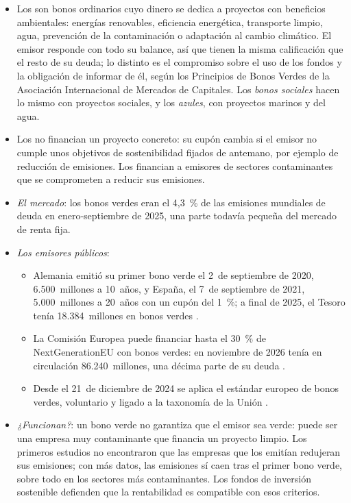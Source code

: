\documentclass[11pt]{article}
\begin{document}
\begin{itemize}
\item Los  son bonos ordinarios cuyo dinero se dedica a proyectos con beneficios ambientales: energías renovables, eficiencia energética, transporte limpio, agua, prevención de la contaminación o adaptación al cambio climático. El emisor responde con todo su balance, así que tienen la misma calificación que el resto de su deuda; lo distinto es el compromiso sobre el uso de los fondos y la obligación de informar de él, según los Principios de Bonos Verdes de la Asociación Internacional de Mercados de Capitales\nocite{ICMA2021GBP,Investopedia2026GreenBond}. Los \emph{bonos sociales} hacen lo mismo con proyectos sociales, y los \emph{azules}, con proyectos marinos y del agua.
\item Los  no financian un proyecto concreto: su cupón cambia si el emisor no cumple unos objetivos de sostenibilidad fijados de antemano, por ejemplo de reducción de emisiones\nocite{ICMA2024SLBP}. Los  financian a emisores de sectores contaminantes que se comprometen a reducir sus emisiones.
\item \emph{El mercado}: los bonos verdes eran el 4,3~\% de las emisiones mundiales de deuda en enero-septiembre de 2025\nocite{LSEG2025GreenDebt}, una parte todavía pequeña del mercado de renta fija.
\item \emph{Los emisores públicos}:
  \begin{itemize}
  \item Alemania emitió su primer bono verde el 2~de septiembre de 2020, 6.500~millones a 10~años\nocite{Finanzagentur2020GreenBund}, y España, el 7~de septiembre de 2021, 5.000~millones a 20~años con un cupón del 1~\%\nocite{Moncloa2021BonoVerde}; a final de 2025, el Tesoro tenía 18.384~millones en bonos verdes\nocite{Tesoro2026Estrategia} .
  \item La Comisión Europea puede financiar hasta el 30~\% de NextGenerationEU con bonos verdes\nocite{CE2026NGEUVerdes}: en noviembre de 2026 tenía en circulación 86.240~millones, una décima parte de su deuda\nocite{CE2026Sindicacion10} .
  \item Desde el 21~de diciembre de 2024 se aplica el estándar europeo de bonos verdes, voluntario y ligado a la taxonomía de la Unión\nocite{UE2023EuGB} .
  \end{itemize}
\item \emph{¿Funcionan?}: un bono verde no garantiza que el emisor sea verde: puede ser una empresa muy contaminante que financia un proyecto limpio. Los primeros estudios no encontraron que las empresas que los emitían redujeran sus emisiones\nocite{EhlersMojonPacker2020Green}; con más datos, las emisiones sí caen tras el primer bono verde, sobre todo en los sectores más contaminantes\nocite{DemskiEtAl2025Green}. Los fondos de inversión sostenible defienden que la rentabilidad es compatible con esos criterios\nocite{Forbes2021FondosESG}.
\end{itemize}
\end{document}
